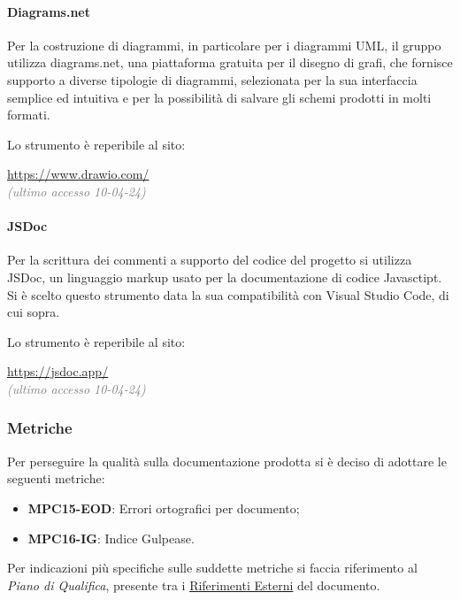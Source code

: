 \paragraph{Diagrams.net}
Per la costruzione di diagrammi, in particolare per i diagrammi UML, il gruppo utilizza diagrams.net, una piattaforma gratuita per il disegno di grafi, che fornisce supporto a diverse tipologie di diagrammi, selezionata per la sua interfaccia semplice ed intuitiva e per la possibilità di salvare gli schemi prodotti in molti formati.
\par Lo strumento è reperibile al sito:
\begin{center}
    \url{https://www.drawio.com/}\\ \textcolor{gray}{\textit{(ultimo accesso 10-04-24)}}
\end{center}

\paragraph{JSDoc}
Per la scrittura dei commenti a supporto del codice del progetto si utilizza JSDoc, un linguaggio markup usato per la documentazione di codice Javasctipt. Si è scelto questo strumento data la sua compatibilità con Visual Studio Code, di cui sopra.
\par Lo strumento è reperibile al sito:
\begin{center}
    \url{https://jsdoc.app/}\\ \textcolor{gray}{\textit{(ultimo accesso 10-04-24)}}
\end{center}

\subsubsection{Metriche}\label{sec:processi_di_supporto:documentazione:metriche}
Per perseguire la qualità sulla documentazione prodotta si è deciso di adottare le seguenti metriche:
\begin{itemize}
    \item \textbf{MPC15-EOD}: Errori ortografici per documento;
    \item \textbf{MPC16-IG}: Indice Gulpease.
\end{itemize}
Per indicazioni più specifiche sulle suddette metriche si faccia riferimento al \textit{Piano di Qualifica}, presente tra i \hyperref[sec:riferimenti_esterni]{Riferimenti Esterni} del documento.

